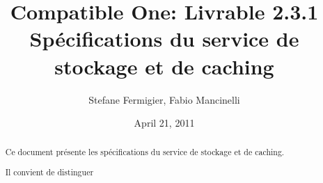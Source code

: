 \documentclass[a4paper,11pt]{article}
\title{Compatible One: Livrable 2.3.1\\
Spécifications du service de stockage et de caching}
\date{April 21, 2011}
\author{Stefane Fermigier, Fabio Mancinelli}
\begin{document}
\maketitle
\tableofcontents

\pagebreak

\begin{abstract}
  Ce document présente les spécifications du service de stockage et de caching.
  
  Il convient de distinguer
\end{abstract}


\end{document}
